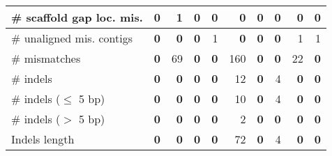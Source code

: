 \documentclass[12pt,a4paper]{article}
\begin{document}
\begin{table}[ht]
\begin{center}
\begin{tabular}{|l*{9}{|r}|}
\# scaffold gap loc. mis. & {\bf 0} & 1 & {\bf 0} & {\bf 0} & {\bf 0} & {\bf 0} & {\bf 0} & {\bf 0} & {\bf 0} \\ \hline
\# unaligned mis. contigs & {\bf 0} & {\bf 0} & {\bf 0} & 1 & {\bf 0} & {\bf 0} & {\bf 0} & 1 & 1 \\ \hline
\# mismatches & {\bf 0} & 69 & {\bf 0} & {\bf 0} & 160 & {\bf 0} & {\bf 0} & 22 & {\bf 0} \\ \hline
\# indels & {\bf 0} & {\bf 0} & {\bf 0} & {\bf 0} & 12 & {\bf 0} & 4 & {\bf 0} & {\bf 0} \\ \hline
\hspace{5mm}\# indels ($\leq$ 5 bp) & {\bf 0} & {\bf 0} & {\bf 0} & {\bf 0} & 10 & {\bf 0} & 4 & {\bf 0} & {\bf 0} \\ \hline
\hspace{5mm}\# indels ($>$ 5 bp) & {\bf 0} & {\bf 0} & {\bf 0} & {\bf 0} & 2 & {\bf 0} & {\bf 0} & {\bf 0} & {\bf 0} \\ \hline
Indels length & {\bf 0} & {\bf 0} & {\bf 0} & {\bf 0} & 72 & {\bf 0} & 4 & {\bf 0} & {\bf 0} \\ \hline
\end{tabular}
\end{center}
\end{table}
\end{document}
